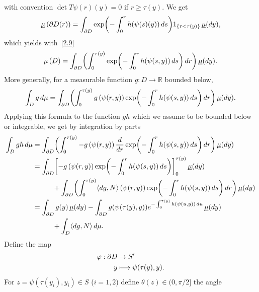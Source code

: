 \documentclass[10pt]{amsart}
\newcommand\mto{\mathchoice{\longmapsto}{\mapsto}{\mapsto}{\mapsto}}
\theoremstyle{plain}
\theoremstyle{definition}
\newcommand{\RR}{{\mathbb R}}
\newcommand{\usm}{{\underline{\smash{\mu}}}}
\let\f\frac
\begin{document}
with convention $\det T\psi(r)(y)=0$ if $r\ge \tau(y)$. We get
\begin{equation}
\usm\left(\partial D(r)\right)=\int_{\partial D}\exp\biggl(-\int_0^rh(\psi(s)(y))\,ds \biggr)1_{\{r<\tau(y)\}}\,\usm(dy),
\end{equation}
which yields with~\eqref{2.9}
\begin{equation}
\mu\left(D\right)=\int_{\partial D}\biggl(\int_0^{\tau(y)}\exp\biggl(-\int_0^rh(\psi(s,y))\,ds \biggr)\, dr\biggr)\,\usm(dy).
\end{equation}
More generally, for a measurable function $g: D\to \RR$ bounded below,\vspace*{-3pt}
\begin{equation}
\int_Dg\,d\mu=\int_{\partial D}\biggl(\int_0^{\tau(y)}g\left(\psi(r,y)\right)\exp\biggl(-\int_0^rh(\psi(s,y))\,ds \biggr)\, dr\biggr)\,\usm(dy).
\end{equation}
Applying this formula to the function $gh$ which we assume to be bounded below or integrable, we get by integration by parts\vspace*{-3pt}
\begin{align*}
\int_Dgh\,d\mu&=\int_{\partial D}\biggl(\int_0^{\tau(y)}-g\left(\psi(r,y)\right)\f{d}{dr}\exp\biggl(-\int_0^rh(\psi(s,y))\,ds \biggr)\, dr\biggr)\,\usm(dy)\\
&=\int_{\partial D}\biggl[-g\left(\psi(r,y)\right)\exp\biggl(-\int_0^rh(\psi(s,y))\,ds\biggr)\biggr]_0^{\tau(y)}\,\usm(dy)\\
&\hspace*{1cm}+\int_{\partial D}\biggl(\int_0^{\tau(y)}\langle dg,N\rangle\left(\psi(r,y)\right)\exp\biggl(-\int_0^rh(\psi(s,y))\,ds \biggr)\, dr\biggr)\,\usm(dy)\\
&=\int_{\partial D}g(y)\,\usm(dy)-\int_{\partial D}g(\psi(\tau(y),y))e^{-\int_0^{\tau(y)}h(\psi(u,y))\,du}\,\usm(dy)\\
&\hspace*{1cm}+\int_D\langle dg,N\rangle \, d\mu.
\end{align*}
Define the map\vspace*{-5pt}
\begin{equation}
\begin{split}
\varphi: \partial D &\to S'\\
y&\mto \psi(\tau(y),y).
\end{split}
\end{equation}
For $z=\psi(\tau(y_i),y_i)\in S$ ($i=1,2$) define $\theta(z){\in(0,\pi/2]}$ the angle
\end{document}
